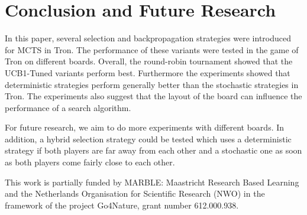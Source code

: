 \documentclass{article}
\begin{document}
\section{Conclusion and Future Research}
\label{sec:conclusion}

In this paper, several selection and backpropagation strategies were introduced for MCTS in Tron.
The performance of these variants were tested in the game of Tron on different boards.
Overall, the round-robin tournament showed that the UCB1-Tuned variants perform best. %
Furthermore the experiments showed that deterministic strategies perform generally better than the stochastic strategies in Tron.
The experiments also suggest that the layout of the board can influence the performance of a search algorithm.

For future research, we aim to do more experiments with different boards. 
In addition, a hybrid selection strategy could be tested which uses a deterministic strategy if both players are far away from each other and a stochastic one as soon as both players come fairly close to each other. 

\vspace{0.2cm}
 {\small This work is partially funded by MARBLE: Maastricht
Research Based Learning and the Netherlands Organisation
for Scientific Research (NWO) in the framework of the project
Go4Nature, grant number 612.000.938. }

\vspace{-0.5cm}


\end{document}

